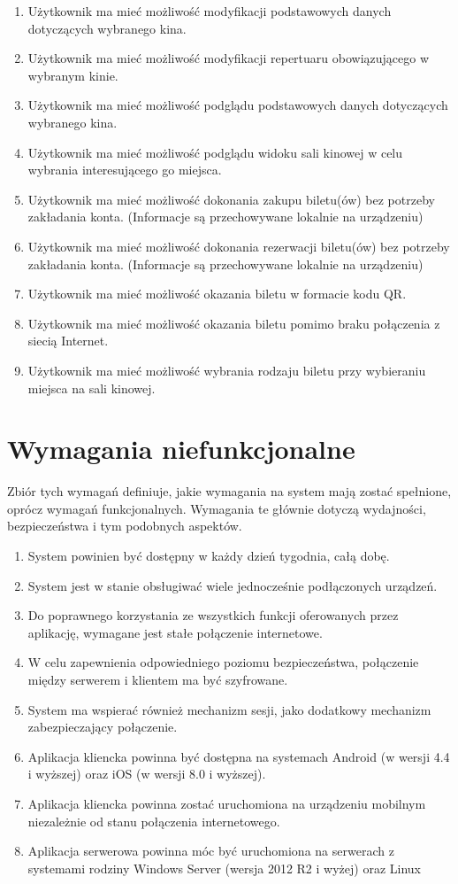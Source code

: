 \begin{enumerate}
\item Użytkownik ma mieć możliwość modyfikacji podstawowych danych dotyczących wybranego kina.
\item Użytkownik ma mieć możliwość modyfikacji repertuaru obowiązującego w wybranym kinie.
\item Użytkownik ma mieć możliwość podglądu podstawowych danych dotyczących wybranego kina.
\item Użytkownik ma mieć możliwość podglądu widoku sali kinowej w celu wybrania interesującego go miejsca.
\item Użytkownik ma mieć możliwość dokonania zakupu biletu(ów) bez potrzeby zakładania konta. (Informacje są przechowywane lokalnie na urządzeniu)
\item Użytkownik ma mieć możliwość dokonania rezerwacji biletu(ów) bez potrzeby zakładania konta. (Informacje są przechowywane lokalnie na urządzeniu)
\item Użytkownik ma mieć możliwość okazania biletu w formacie kodu QR.
\item Użytkownik ma mieć możliwość okazania biletu pomimo braku połączenia z siecią Internet.
\item Użytkownik ma mieć możliwość wybrania rodzaju biletu przy wybieraniu miejsca na sali kinowej.
\end{enumerate}
\section{Wymagania niefunkcjonalne}
Zbiór tych wymagań definiuje, jakie wymagania na system mają zostać spełnione, oprócz wymagań funkcjonalnych. Wymagania te głównie dotyczą wydajności, bezpieczeństwa i tym podobnych aspektów.
\begin{enumerate}
\item System powinien być dostępny w każdy dzień tygodnia, całą dobę.
\item System jest w stanie obsługiwać wiele jednocześnie podłączonych urządzeń.
\item Do poprawnego korzystania ze wszystkich funkcji oferowanych przez aplikację, wymagane jest stałe połączenie internetowe.
\item W celu zapewnienia odpowiedniego poziomu bezpieczeństwa, połączenie między serwerem i klientem ma być szyfrowane.
\item System ma wspierać również mechanizm sesji, jako dodatkowy mechanizm zabezpieczający połączenie.
\item Aplikacja kliencka powinna być dostępna na systemach Android (w wersji 4.4 i wyższej) oraz iOS (w wersji 8.0 i wyższej).
\item Aplikacja kliencka powinna zostać uruchomiona na urządzeniu mobilnym niezależnie od stanu połączenia internetowego.
\item Aplikacja serwerowa powinna móc być uruchomiona na serwerach z systemami rodziny Windows Server (wersja 2012 R2 i wyżej) oraz Linux

\end{enumerate}
